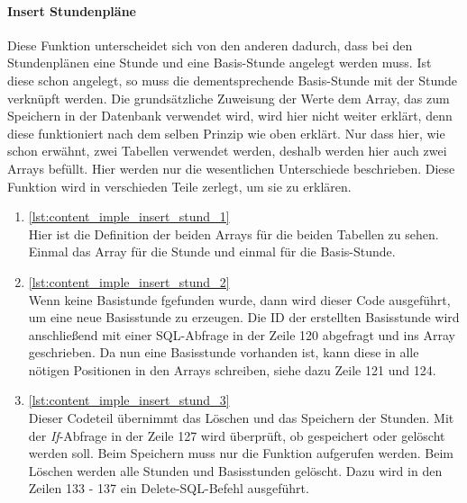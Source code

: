 \paragraph{Insert Stundenpläne\\}
Diese Funktion unterscheidet sich von den anderen dadurch, dass bei den Stundenplänen eine Stunde und eine Basis-Stunde angelegt werden muss. Ist diese schon angelegt, so muss die dementsprechende Basis-Stunde mit der Stunde verknüpft werden. Die grundsätzliche Zuweisung der Werte dem Array, das zum Speichern in der Datenbank verwendet wird, wird hier nicht weiter erklärt, denn diese funktioniert nach dem selben Prinzip wie oben erklärt. Nur dass hier, wie schon erwähnt, zwei Tabellen verwendet werden, deshalb werden hier auch zwei Arrays befüllt. Hier werden nur die wesentlichen Unterschiede beschrieben. Diese Funktion wird in verschieden Teile zerlegt, um sie zu erklären.\\
\begin{enumerate}
	\item \autoref{lst:content_imple_insert_stund_1}\\
	Hier ist die Definition der beiden Arrays für die beiden Tabellen zu sehen. Einmal das Array für die Stunde und einmal für die Basis-Stunde.
	
	
	
	\item \autoref{lst:content_imple_insert_stund_2}\\
	Wenn keine Basistunde fgefunden wurde, dann wird dieser Code ausgeführt, um eine neue Basisstunde zu erzeugen. Die ID der erstellten Basisstunde wird anschließend mit einer SQL-Abfrage in der Zeile 120 abgefragt und ins Array geschrieben. Da nun eine Basisstunde vorhanden ist, kann diese in alle nötigen Positionen in den Arrays schreiben, siehe dazu Zeile 121 und 124.
	
	
	
	\item \autoref{lst:content_imple_insert_stund_3}\\
	Dieser Codeteil übernimmt das Löschen und das Speichern der Stunden. Mit der \textit{If}-Abfrage in der Zeile 127 wird überprüft, ob gespeichert oder gelöscht werden soll. Beim Speichern muss nur die Funktion aufgerufen werden. Beim Löschen werden alle Stunden und Basisstunden gelöscht. Dazu wird in den Zeilen 133 - 137 ein Delete-SQL-Befehl ausgeführt.

\newpage
	
		
	
\end{enumerate}

